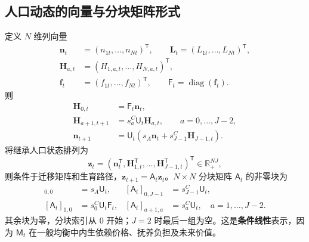 \documentclass[UTF8,a4paper,zihao=-4,fontset=windows]{ctexart}
\numberwithin{equation}{section}
\DeclareMathOperator{\diag}{diag}
\begin{document}
\subsection{人口动态的向量与分块矩阵形式}
定义 $N$ 维列向量
\begin{align}
 \bm n_t&=(n_{1t},\ldots,n_{Nt})^{\mathsf T},\qquad
 \bm L_t=(L_{1t},\ldots,L_{Nt})^{\mathsf T},\\
 \bm H_{a,t}&=(H_{1,a,t},\ldots,H_{N,a,t})^{\mathsf T},\\
 \bm f_t&=(f_{1t},\ldots,f_{Nt})^{\mathsf T},\qquad
 \mathsf F_t=\diag(\bm f_t).
\end{align}
则
\begin{align}
 \bm H_{0,t}&=\mathsf F_t\bm n_t,\label{eq:lg-vector-birth}\\
 \bm H_{a+1,t+1}&=s^C_a\mathsf U_t\bm H_{a,t},
 \qquad a=0,\ldots,J-2,\label{eq:lg-vector-child}\\
 \bm n_{t+1}&=\mathsf U_t
 \left(s_A\bm n_t+s^C_{J-1}\bm H_{J-1,t}\right).
 \label{eq:lg-vector-adult}
\end{align}
将继承人口状态排列为
\begin{equation}
 \bm z_t=(\bm n_t^{\mathsf T},\bm H_{1,t}^{\mathsf T},\ldots,
 \bm H_{J-1,t}^{\mathsf T})^{\mathsf T}\in\mathbb R_+^{NJ},
\end{equation}
则条件于迁移矩阵和生育路径，$\bm z_{t+1}=\mathsf A_t\bm z_t$。$N\times N$ 分块矩阵 $\mathsf A_t$ 的非零块为
\begin{align}
 [\mathsf A_t]_{0,0}&=s_A\mathsf U_t,&
 [\mathsf A_t]_{0,J-1}&=s^C_{J-1}\mathsf U_t,\\
 [\mathsf A_t]_{1,0}&=s^C_0\mathsf U_t\mathsf F_t,&
 [\mathsf A_t]_{a+1,a}&=s^C_a\mathsf U_t,
 \quad a=1,\ldots,J-2.
 \label{eq:lg-demographic-blocks}
\end{align}
其余块为零，分块索引从 $0$ 开始；$J=2$ 时最后一组为空。这是\textbf{条件线性}表示，因为 $\mathsf M_t$ 在一般均衡中内生依赖价格、抚养负担及未来价值。
\end{document}
